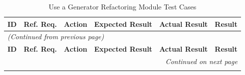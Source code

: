 \documentclass[12pt, titlepage]{article}
\begin{document}
\begin{longtable}{c
    >{\raggedright\arraybackslash}p{1.5cm}
    >{\raggedright\arraybackslash}p{4.5cm}
    >{\raggedright\arraybackslash}p{4cm}
  >{\raggedright\arraybackslash}p{3cm} c}
  \toprule
  \textbf{ID} & \textbf{Ref. Req.} & \textbf{Action} &
  \textbf{Expected Result} & \textbf{Actual Result} & \textbf{Result} \\
  \midrule
  \endfirsthead

  \multicolumn{6}{l}{\textit{(Continued from previous page)}} \\
  \toprule
  \textbf{ID} & \textbf{Ref. Req.} & \textbf{Action} &
  \textbf{Expected Result} & \textbf{Actual Result} & \textbf{Result} \\
  \midrule
  \endhead

  \multicolumn{6}{r}{\textit{Continued on next page}} \\
  \endfoot

  \bottomrule
  \caption{Use a Generator Refactoring Module Test Cases}
  \label{table:ugen_refactor_tests}
  \endlastfoot


\end{longtable}
\end{document}
